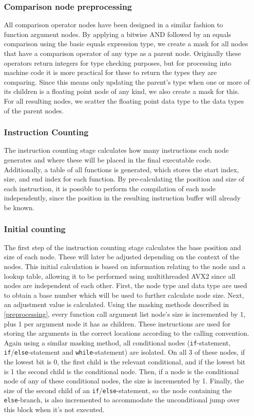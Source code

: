 \documentclass[11pt,dvipsnames]{article}
\newcommand{\icpp}[1]{\texttt{#1}}
\begin{document}
\subsubsection*{Comparison node preprocessing}
All comparison operator nodes have been designed in a similar fashion to function argument nodes. By applying a bitwise AND followed by an equals comparison using the basic equals expression type, we create a mask for all nodes that have a comparison operator of any type as a parent node. Originally these operators return integers for type checking purposes, but for processing into machine code it is more practical for these to return the types they are comparing. Since this means only updating the parent's type when one or more of its children is a floating point node of any kind, we also create a mask for this. For all resulting nodes, we scatter the floating point data type to the data types of the parent nodes.

\subsubsection{Instruction Counting}
The instruction counting stage calculates how many instructions each node generates and where these will be placed in the final executable code. Additionally, a table of all functions is generated, which stores the start index, size, and end index for each function. By pre-calculating the position and size of each instruction, it is possible to perform the compilation of each node independently, since the position in the resulting instruction buffer will already be known.

\subsubsection*{Initial counting}
The first step of the instruction counting stage calculates the base position and size of each node. These will later be adjusted depending on the context of the nodes. This initial calculation is based on information relating to the node and a lookup table, allowing it to be performed using multithreaded AVX2 since all nodes are independent of each other. First, the node type and data type are used to obtain a base number which will be used to further calculate node size. Next, an adjustment value is calculated. Using the masking methods described in \autoref{preprocessing}, every function call argument list node's size is incremented by 1, plus 1 per argument node it has as children. These instructions are used for storing the arguments in the correct locations according to the calling convention. Again using a similar masking method, all conditional nodes (\icpp{if}-statement, \icpp{if}/\icpp{else}-statement and \icpp{while}-statement) are isolated. On all 3 of these nodes, if the lowest bit is 0, the first child is the relevant conditional, and if the lowest bit is 1 the second child is the conditional node. Then, if a node is the conditional node of any of these conditional nodes, the size is incremented by 1. Finally, the size of the second child of an \icpp{if}/\icpp{else}-statement, so the node containing the \icpp{else}-branch, is also incremented to accommodate the unconditional jump over this block when it's not executed.
\end{document}

